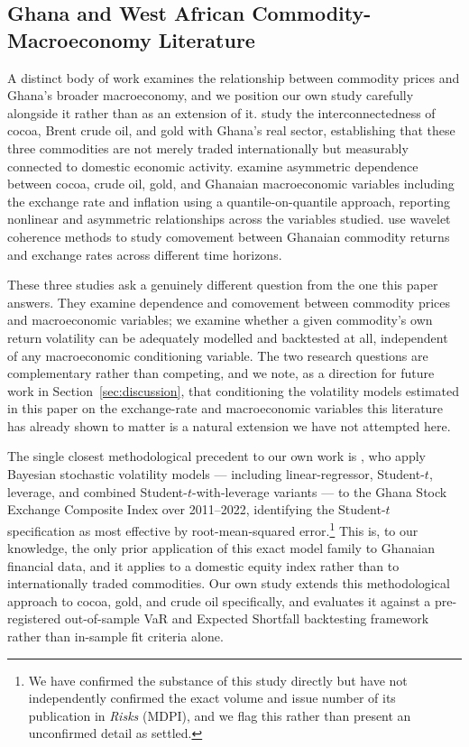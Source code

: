 \documentclass[preprint,12pt,authoryear]{elsarticle}
\begin{document}
\subsection{Ghana and West African Commodity-Macroeconomy Literature}

A distinct body of work examines the relationship between commodity prices and Ghana's broader macroeconomy, and we position our own study carefully alongside it rather than as an extension of it. \citet{boateng2022} study the interconnectedness of cocoa, Brent crude oil, and gold with Ghana's real sector, establishing that these three commodities are not merely traded internationally but measurably connected to domestic economic activity. \citet{yeboah2025} examine asymmetric dependence between cocoa, crude oil, gold, and Ghanaian macroeconomic variables including the exchange rate and inflation using a quantile-on-quantile approach, reporting nonlinear and asymmetric relationships across the variables studied. \citet{barson2023} use wavelet coherence methods to study comovement between Ghanaian commodity returns and exchange rates across different time horizons.

These three studies ask a genuinely different question from the one this paper answers. They examine dependence and comovement between commodity prices and macroeconomic variables; we examine whether a given commodity's own return volatility can be adequately modelled and backtested at all, independent of any macroeconomic conditioning variable. The two research questions are complementary rather than competing, and we note, as a direction for future work in Section~\ref{sec:discussion}, that conditioning the volatility models estimated in this paper on the exchange-rate and macroeconomic variables this literature has already shown to matter is a natural extension we have not attempted here.

The single closest methodological precedent to our own work is \citet{tweneboah2025}, who apply Bayesian stochastic volatility models --- including linear-regressor, Student-$t$, leverage, and combined Student-$t$-with-leverage variants --- to the Ghana Stock Exchange Composite Index over 2011--2022, identifying the Student-$t$ specification as most effective by root-mean-squared error.\footnote{We have confirmed the substance of this study directly but have not independently confirmed the exact volume and issue number of its publication in \textit{Risks} (MDPI), and we flag this rather than present an unconfirmed detail as settled.} This is, to our knowledge, the only prior application of this exact model family to Ghanaian financial data, and it applies to a domestic equity index rather than to internationally traded commodities. Our own study extends this methodological approach to cocoa, gold, and crude oil specifically, and evaluates it against a pre-registered out-of-sample VaR and Expected Shortfall backtesting framework rather than in-sample fit criteria alone.
\end{document}
